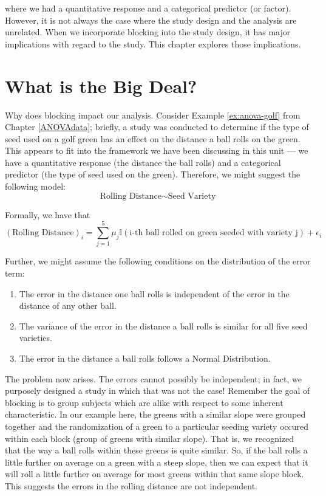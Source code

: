 \documentclass[]{book}
\providecommand{\tightlist}{%
  \setlength{\itemsep}{0pt}\setlength{\parskip}{0pt}}
\theoremstyle{definition}
\theoremstyle{definition}
\theoremstyle{remark}
\begin{document}
where we had a quantitative response and a categorical predictor (or
factor). However, it is not always the case where the study design and
the analysis are unrelated. When we incorporate blocking into the study
design, it has major implications with regard to the study. This chapter
explores those implications.

\section{What is the Big Deal?}\label{what-is-the-big-deal}

Why does blocking impact our analysis. Consider Example
\ref{ex:anova-golf} from Chapter \ref{ANOVAdata}; briefly, a study was
conducted to determine if the type of seed used on a golf green has an
effect on the distance a ball rolls on the green. This appears to fit
into the framework we have been discussing in this unit --- we have a
quantitative response (the distance the ball rolls) and a categorical
predictor (the type of seed used on the green). Therefore, we might
suggest the following model:
\[\text{Rolling Distance} \sim \text{Seed Variety}\]

Formally, we have that
\[(\text{Rolling Distance})_i = \sum_{j=1}^{5} \mu_j \mathbb{I}(\text{i-th ball rolled on green seeded with variety j}) + \epsilon_i\]

Further, we might assume the following conditions on the distribution of
the error term:

\begin{enumerate}
\def\labelenumi{\arabic{enumi}.}
\tightlist
\item
  The error in the distance one ball rolls is independent of the error
  in the distance of any other ball.
\item
  The variance of the error in the distance a ball rolls is similar for
  all five seed varieties.
\item
  The error in the distance a ball rolls follows a Normal Distribution.
\end{enumerate}

The problem now arises. The errors cannot possibly be independent; in
fact, we purposely designed a study in which that was not the case!
Remember the goal of blocking is to group subjects which are alike with
respect to some inherent characteristic. In our example here, the greens
with a similar slope were grouped together and the randomization of a
green to a particular seeding variety occured within each block (group
of greens with similar slope). That is, we recognized that the way a
ball rolls within these greens is quite similar. So, if the ball rolls a
little further on average on a green with a steep slope, then we can
expect that it will roll a little further on average for most greens
within that same slope block. This suggests the errors in the rolling
distance are not independent.
\end{document}

